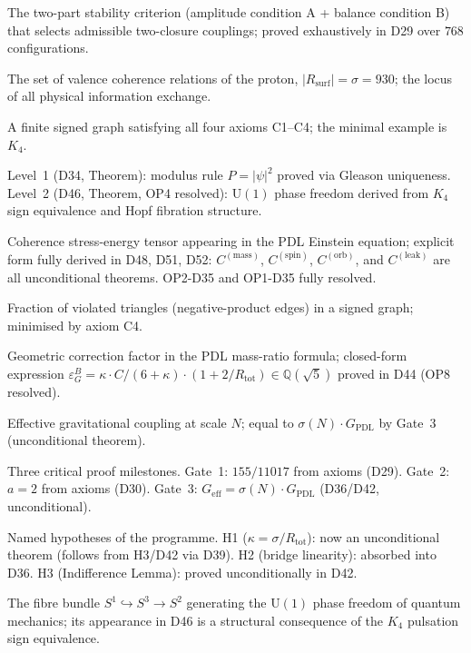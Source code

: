 \documentclass[11pt,a4paper]{article}
\theoremstyle{plain}
\theoremstyle{definition}
\theoremstyle{remark}
\newcommand{\Geff}{G_{\mathrm{eff}}}
\newcommand{\GPDL}{G_{\mathrm{PDL}}}
\newcommand{\Rsurf}{R_{\mathrm{surf}}}
\newcommand{\Rtot}{R_{\mathrm{tot}}}
\newcommand{\sigmaN}{\sigma(N)}
\newcommand{\epsGeomB}{\varepsilon_G^B}
\newcommand{\Ccoh}{C_{\mathrm{coh}}}
\begin{document}
\begin{description}[leftmargin=3.5cm, style=nextline]
\item[AB criterion] The two-part stability criterion (amplitude condition A + balance condition B) that selects admissible two-closure couplings; proved exhaustively in D29 over $768$ configurations.
\item[Active surface $\Rsurf$] The set of valence coherence relations of the proton, $|\Rsurf|=\sigma=930$; the locus of all physical information exchange.
\item[Admissible closure] A finite signed graph satisfying all four axioms C1--C4; the minimal example is $K_4$.
\item[Born Level~1 / Level~2] Level~1 (D34, Theorem): modulus rule $P=|\psi|^2$ proved via Gleason uniqueness. Level~2 (D46, Theorem, OP4 resolved): $\mathrm{U}(1)$ phase freedom derived from $K_4$ sign equivalence and Hopf fibration structure.
\item[$\Ccoh$] Coherence stress-energy tensor appearing in the PDL Einstein equation; explicit form fully derived in D48, D51, D52: $C^{(\mathrm{mass})}$, $C^{(\mathrm{spin})}$, $C^{(\mathrm{orb})}$, and $C^{(\mathrm{leak})}$ are all unconditional theorems. OP2-D35 and OP1-D35 fully resolved.
\item[Coherence cost] Fraction of violated triangles (negative-product edges) in a signed graph; minimised by axiom C4.
\item[$\epsGeomB$] Geometric correction factor in the PDL mass-ratio formula; closed-form expression $\epsGeomB = \kappa \cdot C/(6+\kappa)\cdot(1+2/\Rtot) \in \mathbb{Q}(\sqrt{5})$ proved in D44 (OP8 resolved).
\item[$\Geff(N)$] Effective gravitational coupling at scale $N$; equal to $\sigmaN\cdot\GPDL$ by Gate~3 (unconditional theorem).
\item[Gate 1, 2, 3] Three critical proof milestones. Gate~1: $155/11017$ from axioms (D29). Gate~2: $a=2$ from axioms (D30). Gate~3: $\Geff=\sigmaN\cdot\GPDL$ (D36/D42, unconditional).
\item[H1, H2, H3] Named hypotheses of the programme. H1 ($\kappa=\sigma/R_{\mathrm{tot}}$): now an unconditional theorem (follows from H3/D42 via D39). H2 (bridge linearity): absorbed into D36. H3 (Indifference Lemma): proved unconditionally in D42.
\item[Hopf fibration] The fibre bundle $S^1\hookrightarrow S^3\to S^2$ generating the $\mathrm{U}(1)$ phase freedom of quantum mechanics; its appearance in D46 is a structural consequence of the $K_4$ pulsation sign equivalence.

\end{description}
\end{document}
